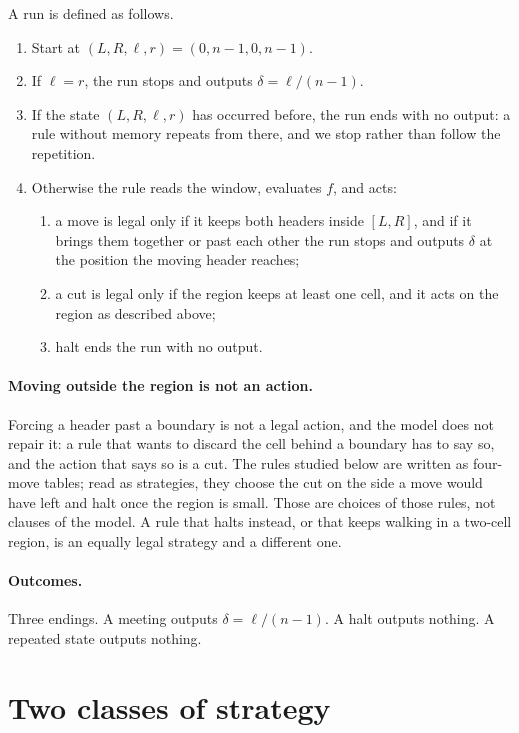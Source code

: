 \documentclass[11pt]{article}
\begin{document}
A run is defined as follows.
\begin{enumerate}
\item Start at $(L,R,\ell,r)=(0,n-1,0,n-1)$.
\item If $\ell=r$, the run stops and outputs $\delta=\ell/(n-1)$.
\item If the state $(L,R,\ell,r)$ has occurred before, the run ends with no output: a rule without
memory repeats from there, and we stop rather than follow the repetition.
\item Otherwise the rule reads the window, evaluates $f$, and acts:
\begin{enumerate}
\item a move is legal only if it keeps both headers inside $[L,R]$, and if it brings them together or
past each other the run stops and outputs $\delta$ at the position the moving header reaches;
\item a cut is legal only if the region keeps at least one cell, and it acts on the region as
described above;
\item halt ends the run with no output.
\end{enumerate}
\end{enumerate}

\paragraph{Moving outside the region is not an action.} Forcing a header past a boundary is not a legal
action, and the model does not repair it: a rule that wants to discard the cell behind a boundary has
to say so, and the action that says so is a cut. The rules studied below are written as four-move
tables; read as strategies, they choose the cut on the side a move would have left and halt once the
region is small. Those are choices of those rules, not clauses of the model. A rule that halts
instead, or that keeps walking in a two-cell region, is an equally legal strategy and a different one.

\paragraph{Outcomes.} Three endings. A meeting outputs $\delta=\ell/(n-1)$. A halt outputs nothing. A
repeated state outputs nothing.

\section{Two classes of strategy}\label{sec:classes}
\end{document}

